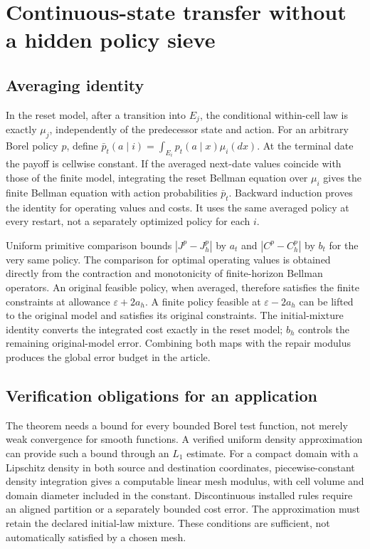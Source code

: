 \section{Continuous-state transfer without a hidden policy sieve}
\subsection{Averaging identity}
In the reset model, after a transition into $E_j$, the conditional within-cell law is exactly $\mu_j$, independently of the predecessor state and action. For an arbitrary Borel policy $p$, define $\bar p_t(a\mid i)=\int_{E_i}p_t(a\mid x)\mu_i(dx)$. At the terminal date the payoff is cellwise constant. If the averaged next-date values coincide with those of the finite model, integrating the reset Bellman equation over $\mu_i$ gives the finite Bellman equation with action probabilities $\bar p_t$. Backward induction proves the identity for operating values and costs. It uses the same averaged policy at every restart, not a separately optimized policy for each $i$.

Uniform primitive comparison bounds $|J^p-J_h^p|$ by $a_t$ and $|C^p-C_h^p|$ by $b_t$ for the very same policy. The comparison for optimal operating values is obtained directly from the contraction and monotonicity of finite-horizon Bellman operators. An original feasible policy, when averaged, therefore satisfies the finite constraints at allowance $\varepsilon+2a_h$. A finite policy feasible at $\varepsilon-2a_h$ can be lifted to the original model and satisfies its original constraints. The initial-mixture identity converts the integrated cost exactly in the reset model; $b_h$ controls the remaining original-model error. Combining both maps with the repair modulus produces the global error budget in the article.

\subsection{Verification obligations for an application}
The theorem needs a bound for every bounded Borel test function, not merely weak convergence for smooth functions. A verified uniform density approximation can provide such a bound through an $L_1$ estimate. For a compact domain with a Lipschitz density in both source and destination coordinates, piecewise-constant density integration gives a computable linear mesh modulus, with cell volume and domain diameter included in the constant. Discontinuous installed rules require an aligned partition or a separately bounded cost error. The approximation must retain the declared initial-law mixture. These conditions are sufficient, not automatically satisfied by a chosen mesh.

